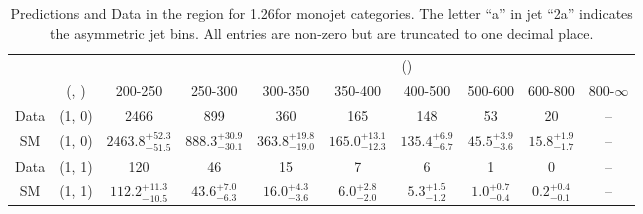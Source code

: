 \begin{table}[h!]
\tiny
\centering
\caption{Predictions and Data in the \mj region for 1.26\ifb for monojet categories. The letter ``a'' in jet \eg ``2a''  indicates the asymmetric jet bins. All entries are non-zero but are truncated to one decimal place.\label{tab:predall_mu_comb_mono}}
\begin{tabular}
{cccccccccc}
	\hline\hline
&	&	& \multicolumn{8}{c}{\scalht (\gev)}\\ 
	&	 (\njet, \nb) & 200-250 & 250-300 & 300-350 & 350-400 & 400-500 & 500-600 & 600-800 & 800-$\infty$ \\ [0.8ex] 
\hline
	Data & (1, 0) & 2466 & 899 & 360 & 165 & 148 & 53 & 20 & -- \\[0.5ex] 
	SM & (1, 0) & $2463.8^{+ 52.3 }_{- 51.5 }$ & $888.3^{+ 30.9 }_{- 30.1 }$ & $363.8^{+ 19.8 }_{- 19.0 }$ & $165.0^{+ 13.1 }_{- 12.3 }$ & $135.4^{+ 6.9 }_{- 6.7 }$ & $45.5^{+ 3.9 }_{- 3.6 }$ & $15.8^{+ 1.9 }_{- 1.7 }$ & -- \\[0.5ex] 
	Data & (1, 1) & 120 & 46 & 15 & 7 & 6 & 1 & 0 & -- \\[0.5ex] 
	SM & (1, 1) & $112.2^{+ 11.3 }_{- 10.5 }$ & $43.6^{+ 7.0 }_{- 6.3 }$ & $16.0^{+ 4.3 }_{- 3.6 }$ & $6.0^{+ 2.8 }_{- 2.0 }$ & $5.3^{+ 1.5 }_{- 1.2 }$ & $1.0^{+ 0.7 }_{- 0.4 }$ & $0.2^{+ 0.4 }_{- 0.1 }$ & -- \\[0.5ex] 
	\hline
	\hline
\end{tabular}
\end{table}
